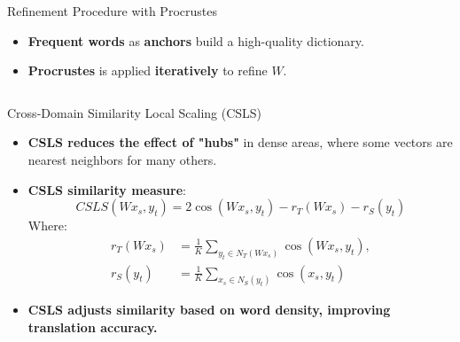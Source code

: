 \documentclass[final]{beamer}
\newlength{\onecolwid}
\newlength{\twocolwid}
\DeclareMathOperator*{\argmin}{argmin}
\begin{document}
\begin{frame}[t]
\begin{columns}[t]
\begin{column}{\twocolwid}
\begin{column}{\onecolwid}
\begin{block}{Refinement Procedure with Procrustes}
\begin{itemize}
	        \[
    W^* = \argmin_{W \in O_d(\mathbb{R})} \| W X - Y \|_F = UV^{T}, 
\]
\[
    \text{where } U \text{ and } V^T \text{ are from } \text{SVD}(YX^T).
\]
	 	\item \textbf{Frequent words} as \textbf{anchors} build a high-quality dictionary.
	\item \textbf{Procrustes} is applied \textbf{iteratively} to refine \( W \).
	    \end{itemize}
	\end{block}
\end{column}
\begin{column}{\onecolwid}
	\begin{block}{Cross-Domain Similarity Local Scaling (CSLS)}
	    \begin{itemize}
	        \item \textbf{CSLS reduces the effect of "hubs"} in dense areas, where some vectors are nearest neighbors for many others.
	\item \textbf{CSLS similarity measure}:
	\[
	    CSLS(W x_s, y_t) = 2 \cos(W x_s, y_t) - r_T(W x_s) - r_S(y_t)
	\]
	Where:
	\begin{align*}
	    r_T(W x_s) &= \frac{1}{K} \sum_{y_t \in N_T(W x_s)} \cos(W x_s, y_t), \\
	    r_S(y_t) &= \frac{1}{K} \sum_{x_s \in N_S(y_t)} \cos(x_s, y_t)
	\end{align*}
	\item \textbf{CSLS adjusts similarity based on word density, improving translation accuracy.}
	
	    \end{itemize}
	\end{block}
\end{column}




\end{column}
\end{columns}
\end{frame}
\end{document}
